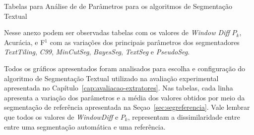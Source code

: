 \documentclass{article}
\begin{document}
 

Tabelas para Análise de de Parâmetros para os algoritmos de Segmentação Textual


Nesse anexo podem ser observadas tabelas com os valores de \textit{Window Diff} $P_k$, Acurácia, e F$^1$ com as variações dos principais parâmetros dos segmentadores \textit{TextTiling}, \textit{C99}, \textit{MinCutSeg}, \textit{BayesSeg}, \textit{TextSeg} e \textit{PseudoSeg}.

Todos os gráficos apresentados foram analisados para escolha e configuração do algoritmo de Segmentação Textual utilizado na avaliação experimental apresentada no Capítulo~\ref{cap:avaliacao-extratores}. 
Nas tabelas, cada linha apresenta a variação dos parâmetros e a média dos valores obtidos por meio da segmentação de referência apresentada na Seçao~\ref{sec:segreferencia}. Vale lembrar que todos os valores de \textit{WindowDiff} e $P_k$, representam a dissimilaridade entre entre uma segmentação automática e uma referência. 


\newpage

\end{document}
